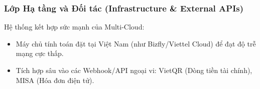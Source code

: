 \subsubsection{Lớp Hạ tầng và Đối tác (Infrastructure \& External APIs)}
Hệ thống kết hợp sức mạnh của Multi-Cloud:
\begin{itemize}
    \item Máy chủ tính toán đặt tại Việt Nam (như Bizfly/Viettel Cloud) để đạt độ trễ mạng cực thấp.
    \item Tích hợp sâu vào các Webhook/API ngoại vi: VietQR (Dòng tiền tài chính), MISA (Hóa đơn điện tử).
\end{itemize}
